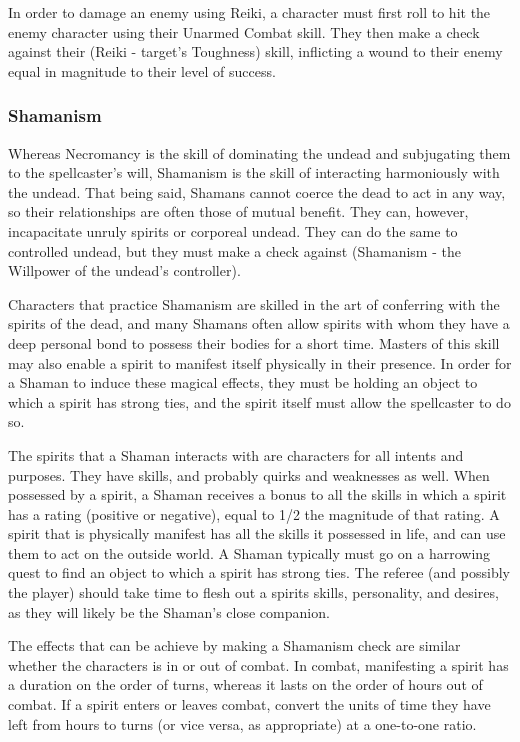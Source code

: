 \documentclass[oneside]{book}
\begin{document}
\begin{multicols}{2}
In order to damage an enemy using Reiki, a character must first roll to hit the enemy character using their Unarmed Combat skill. They then make a check against their (Reiki - target's Toughness) skill, inflicting a wound to their enemy equal in magnitude to their level of success. 

\subsubsection{Shamanism}
Whereas Necromancy is the skill of dominating the undead and subjugating them to the spellcaster's will, Shamanism is the skill of interacting harmoniously with the undead. That being said, Shamans cannot coerce the dead to act in any way, so their relationships are often those of mutual benefit. They can, however, incapacitate unruly spirits or corporeal undead. They can do the same to controlled undead, but they must make a check against (Shamanism - the Willpower of the undead's controller).

Characters that practice Shamanism are skilled in the art of conferring with the spirits of the dead, and many Shamans often allow spirits with whom they have a deep personal bond to possess their bodies for a short time. Masters of this skill may also enable a spirit to manifest itself physically in their presence. In order for a Shaman to induce these magical effects, they must be holding an object to which a spirit has strong ties, and the spirit itself must allow the spellcaster to do so. 

The spirits that a Shaman interacts with are characters for all intents and purposes. They have skills, and probably quirks and weaknesses as well. When possessed by a spirit, a Shaman receives a bonus to all the skills in which a spirit has a rating (positive or negative), equal to 1/2 the magnitude of that rating. A spirit that is physically manifest has all the skills it possessed in life, and can use them to act on the outside world. A Shaman typically must go on a harrowing quest to find an object to which a spirit has strong ties. The referee (and possibly the player) should take time to flesh out a spirits skills, personality, and desires, as they will likely be the Shaman's close companion.

The effects that can be achieve by making a Shamanism check are similar whether the characters is in or out of combat. In combat, manifesting a spirit has a duration on the order of turns, whereas it lasts on the order of hours out of combat. If a spirit enters or leaves combat, convert the units of time they have left from hours to turns (or vice versa, as appropriate) at a one-to-one ratio. 


\end{multicols}
\end{document}
